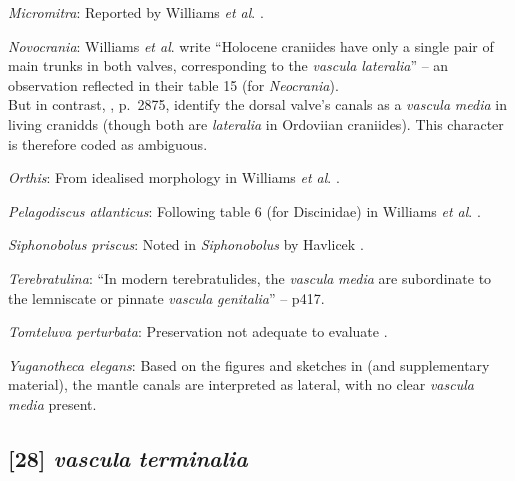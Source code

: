 \documentclass[openany]{book}
\theoremstyle{definition}
\theoremstyle{definition}
\theoremstyle{definition}
\theoremstyle{remark}
\begin{document}
\hypertarget{Micromitra-coding-27}{}
\emph{Micromitra}: Reported by Williams \emph{et al}.
\citeyearpar{Williams1998Thediversity}.

\hypertarget{Novocrania-coding-27}{}
\emph{Novocrania}: Williams \emph{et al}.
\citeyearpar{Williams2000LinguliformeaCraniiformea} write ``Holocene
craniides have only a single pair of main trunks in both valves,
corresponding to the \emph{vascula} \emph{lateralia}'' -- an observation
reflected in their table 15 (for \emph{Neocrania}).\\
But in contrast, \citet{Williams2007Supplement}, p.~2875, identify the
dorsal valve's canals as a \emph{vascula} \emph{media} in living
cranidds (though both are \emph{lateralia} in Ordoviian craniides). This
character is therefore coded as ambiguous.

\hypertarget{Orthis-coding-27}{}
\emph{Orthis}: From idealised morphology in Williams \emph{et al}.
\citeyearpar{Williams2000LinguliformeaCraniiformea}.

\hypertarget{Pelagodiscus_atlanticus-coding-27}{}
\emph{Pelagodiscus atlanticus}: Following table 6 (for Discinidae) in
Williams \emph{et al}.
\citeyearpar{Williams2000LinguliformeaCraniiformea}.

\hypertarget{Siphonobolus_priscus-coding-27}{}
\emph{Siphonobolus priscus}: Noted in \emph{Siphonobolus} by Havlicek
\citeyearpar{Havlicek1982LingulaceaPaterinacea}.

\hypertarget{Terebratulina-coding-27}{}
\emph{Terebratulina}: ``In modern terebratulides, the \emph{vascula}
\emph{media} are subordinate to the lemniscate or pinnate \emph{vascula}
\emph{genitalia}'' -- \citet{Williams1997Introduction} p417.

\hypertarget{Tomteluva_perturbata-coding-27}{}
\emph{Tomteluva perturbata}: Preservation not adequate to evaluate
\citep{Streng2016Anew}.

\hypertarget{Yuganotheca_elegans-coding-27}{}
\emph{Yuganotheca elegans}: Based on the figures and sketches in
\citet{Zhang2014Anearly} (and supplementary material), the mantle canals
are interpreted as lateral, with no clear \emph{vascula} \emph{media}
present.

\subsection*{\texorpdfstring{{[}28{]} \emph{vascula}
\emph{terminalia}}{{[}28{]} vascula terminalia}}\label{vascula-terminalia}
\end{document}
